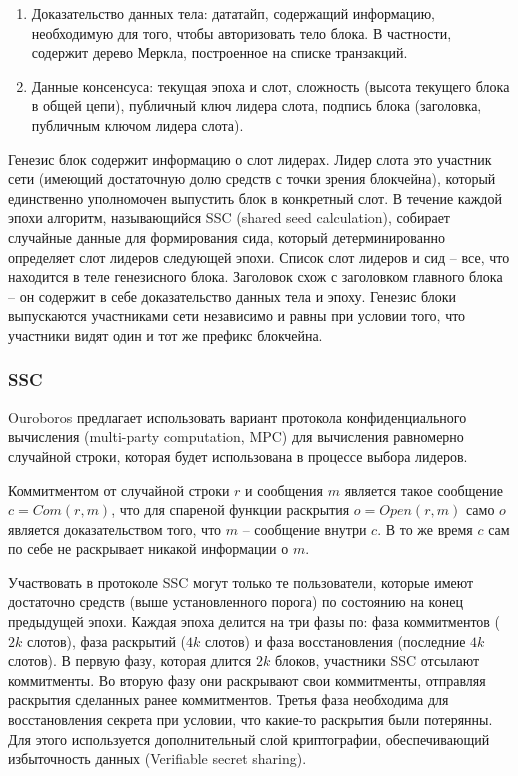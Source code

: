 \documentclass[]{itmo-student-thesis}
\begin{document}
\begin{enumerate}
\item Доказательство данных тела: дататайп, содержащий информацию,
  необходимую для того, чтобы авторизовать тело блока. В частности,
  содержит дерево Меркла, построенное на списке транзакций.
\item Данные консенсуса: текущая эпоха и слот, сложность (высота
  текущего блока в общей цепи), публичный ключ лидера слота, подпись
  блока (заголовка, публичным ключом лидера слота).
\end{enumerate}

Генезис блок содержит информацию о слот лидерах. Лидер слота это
участник сети (имеющий достаточную долю средств с точки зрения
блокчейна), который единственно уполномочен выпустить блок в
конкретный слот. В течение каждой эпохи алгоритм, называющийся SSC
(shared seed calculation), собирает случайные данные для формирования
сида, который детерминированно определяет слот лидеров следующей
эпохи. Список слот лидеров и сид -- все, что находится в теле
генезисного блока. Заголовок схож с заголовком главного блока -- он
содержит в себе доказательство данных тела и эпоху. Генезис блоки
выпускаются участниками сети независимо и равны при условии того, что
участники видят один и тот же префикс блокчейна.

\subsubsection{SSC}

Ouroboros предлагает использовать вариант протокола конфиденциального
вычисления (multi-party computation, MPC) для вычисления равномерно
случайной строки, которая будет использована в процессе выбора
лидеров.

Коммитментом от случайной строки $r$ и сообщения $m$ является такое
сообщение $c = Com(r,m)$, что для спареной функции раскрытия $o =
Open(r,m)$ само $o$ является доказательством того, что $m$ --
сообщение внутри $c$. В то же время $c$ сам по себе не раскрывает
никакой информации о $m$.

Участвовать в протоколе SSC могут только те пользователи, которые
имеют достаточно средств (выше установленного порога) по состоянию на
конец предыдущей эпохи. Каждая эпоха делится на три фазы по: фаза
коммитментов ($2k$ слотов), фаза раскрытий ($4k$ слотов) и фаза
восстановления (последние $4k$ слотов). В первую фазу, которая длится
$2k$ блоков, участники SSC отсылают коммитменты. Во вторую фазу они
раскрывают свои коммитменты, отправляя раскрытия сделанных ранее
коммитментов. Третья фаза необходима для восстановления секрета при
условии, что какие-то раскрытия были потерянны. Для этого используется
дополнительный слой криптографии, обеспечивающий избыточность данных
(Verifiable secret sharing).
\end{document}
